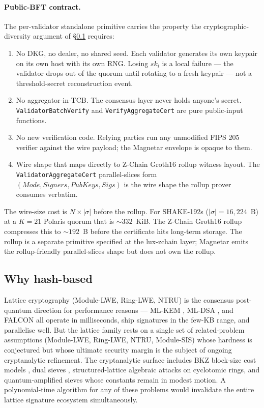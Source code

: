 \paragraph{Public-BFT contract.} The per-validator standalone
primitive carries the property the cryptographic-diversity argument
of \S\ref{sec:intro:whyhash} requires:
\begin{enumerate}[leftmargin=2em,nosep]
  \item No DKG, no dealer, no shared seed. Each validator generates
        its own keypair on its own host with its own RNG. Losing
        $sk_i$ is a local failure --- the validator drops out of the
        quorum until rotating to a fresh keypair --- not a
        threshold-secret reconstruction event.
  \item No aggregator-in-TCB. The consensus layer never holds
        anyone's secret. \texttt{ValidatorBatchVerify} and
        \texttt{VerifyAggregateCert} are pure public-input functions.
  \item No new verification code. Relying parties run any unmodified
        FIPS 205 verifier against the wire payload; the Magnetar
        envelope is opaque to them.
  \item Wire shape that maps directly to Z-Chain Groth16 rollup
        witness layout. The \texttt{ValidatorAggregateCert}
        parallel-slices form
        $(\mathit{Mode}, \mathit{Signers}, \mathit{PubKeys},
        \mathit{Sigs})$ is the wire shape the rollup prover consumes
        verbatim.
\end{enumerate}

The wire-size cost is $N \times |\sigma|$ before the rollup. For
SHAKE-192s ($|\sigma| = 16{,}224$~B) at a $K=21$ Polaris quorum that
is $\sim 332$~KiB. The Z-Chain Groth16 rollup compresses this to
$\sim 192$~B before the certificate hits long-term storage. The
rollup is a separate primitive specified at the lux-zchain layer;
Magnetar emits the rollup-friendly parallel-slices shape but does
not own the rollup.

\subsection{Why hash-based}
\label{sec:intro:whyhash}

Lattice cryptography (Module-LWE, Ring-LWE, NTRU) is the consensus
post-quantum direction for performance reasons --- ML-KEM
\cite{fips203}, ML-DSA \cite{fips204}, and FALCON \cite{falcon} all
operate in milliseconds, ship signatures in the few-KB range, and
parallelise well. But the lattice family rests on a single set of
related-problem assumptions (Module-LWE, Ring-LWE, NTRU, Module-SIS)
whose hardness is conjectured but whose ultimate security margin is the
subject of ongoing cryptanalytic refinement. The cryptanalytic surface
includes BKZ block-size cost models \cite{bdgl2016,laarhoven2015}, dual
sieves \cite{albrechtestimator}, structured-lattice algebraic attacks
on cyclotomic rings, and quantum-amplified sieves whose constants
remain in modest motion. A polynomial-time algorithm for any of these
problems would invalidate the entire lattice signature ecosystem
simultaneously.

